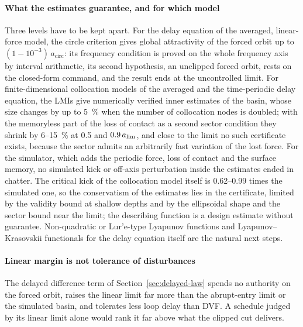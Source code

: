 \paragraph{What the estimates guarantee, and for which model}
Three levels have to be kept apart. For the delay equation of the averaged, linear-force model, the circle criterion gives global attractivity of the forced orbit up to $(1-10^{-3})\,a_{\mathrm{circ}}$: its frequency condition is proved on the whole frequency axis by interval arithmetic, its second hypothesis, an unclipped forced orbit, rests on the closed-form command, and the result ends at the uncontrolled limit. For finite-dimensional collocation models of the averaged and the time-periodic delay equation, the LMIs give numerically verified inner estimates of the basin, whose size changes by up to \SI{5}{\percent} when the number of collocation nodes is doubled; with the memoryless part of the loss of contact as a second sector condition they shrink by 6--\SI{15}{\percent} at 0.5 and $0.9\,a_{\lim}$, and close to the limit no such certificate exists, because the sector admits an arbitrarily fast variation of the lost force. For the simulator, which adds the periodic force, loss of contact and the surface memory, no simulated kick or off-axis perturbation inside the estimates ended in chatter. The critical kick of the collocation model itself is 0.62--0.99 times the simulated one, so the conservatism of the estimates lies in the certificate, limited by the validity bound at shallow depths and by the ellipsoidal shape and the sector bound near the limit; the describing function is a design estimate without guarantee. Non-quadratic or Lur'e-type Lyapunov functions \citep{hu2004lure,hu2006nonquadratic,dai2009piecewise} and Lyapunov--Krasovskii functionals for the delay equation itself \citep{papachristodoulou2009sos} are the natural next steps.

\paragraph{Linear margin is not tolerance of disturbances}
The delayed difference term of Section~\ref{sec:delayed-law} spends no authority on the forced orbit, raises the linear limit far more than the abrupt-entry limit or the simulated basin, and tolerates less loop delay than DVF. A schedule judged by its linear limit alone would rank it far above what the clipped cut delivers.

